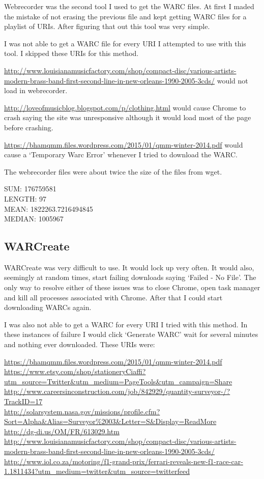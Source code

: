 \documentclass[12pt]{article}
\begin{document}
Webrecorder was the second tool I used to get the WARC files.  At first I maded the mistake of not erasing the previous file and kept getting WARC files for a playlist of URIs.  After figuring that out this tool was very simple.

I was not able to get a WARC file for every URI I attempted to use with this tool. I skipped these URIs for this method.

\url{http://www.louisianamusicfactory.com/shop/compact-disc/various-artists-modern-brass-band-first-second-line-in-new-orleans-1990-2005-3cds/} would not load in webrecorder.

\url{http://loveofmusicblog.blogspot.com/p/clothing.html} would cause Chrome to crash saying the site was unresponsive although it would load most of the page before crashing.

\url{https://bhamqmm.files.wordpress.com/2015/01/qmm-winter-2014.pdf} would cause a `Temporary Warc Error' whenever I tried to download the WARC.

The webrecorder files were about twice the size of the files from wget.

\begin{center}
\noindent SUM:  176759581\\
LENGTH:  97\\
MEAN:  1822263.7216494845\\
MEDIAN:  1005967
\end{center}

\subsection{WARCreate}

WARCreate was very difficult to use.  It would lock up very often.  It would also, seemingly at random times, start failing downloads saying `Failed - No File'.  The only way to resolve either of these issues was to close Chrome, open task manager and kill all processes associated with Chrome.  After that I could start downloading WARCs again.

I was also not able to get a WARC for every URI I tried with this method. In these instances of failure I would click `Generate WARC' wait for several minutes and nothing ever downloaded. These URIs were:

\noindent \url{https://bhamqmm.files.wordpress.com/2015/01/qmm-winter-2014.pdf}\\
\url{https://www.etsy.com/shop/stationeryCiaffi?utm_source=Twitter&utm_medium=PageTools&utm_campaign=Share}\\
\url{http://www.careersinconstruction.com/job/842929/quantity-surveyor-/?TrackID=17}\\
\url{http://solarsystem.nasa.gov/missions/profile.cfm?Sort=Alpha&Alias=Surveyor%2003&Letter=S&Display=ReadMore}\\
\url{http://dg-di.us/OM/FR/613029.htm}\\
\url{http://www.louisianamusicfactory.com/shop/compact-disc/various-artists-modern-brass-band-first-second-line-in-new-orleans-1990-2005-3cds/}\\
\url{http://www.iol.co.za/motoring/f1-grand-prix/ferrari-reveals-new-f1-race-car-1.1811434?utm_medium=twitter&utm_source=twitterfeed}
\end{document}
